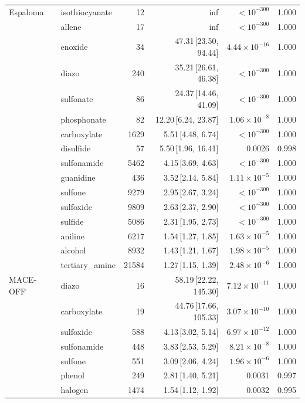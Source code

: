 \begin{table}[t]
\begin{tabular}{llrrrr}
    Espaloma & isothiocyanate & 12 & inf & $< 10^{-300}$ & 1.000 \\
      & allene & 17 & inf & $< 10^{-300}$ & 1.000 \\
      & enoxide & 34 & 47.31\,[23.50, 94.44] & $4.44\times 10^{-16}$ & 1.000 \\
      & diazo & 240 & 35.21\,[26.61, 46.38] & $< 10^{-300}$ & 1.000 \\
      & sulfonate & 86 & 24.37\,[14.46, 41.09] & $< 10^{-300}$ & 1.000 \\
      & phosphonate & 82 & 12.20\,[6.24, 23.87] & $1.06\times 10^{-8}$ & 1.000 \\
      & carboxylate & 1629 & 5.51\,[4.48, 6.74] & $< 10^{-300}$ & 1.000 \\
      & disulfide & 57 & 5.50\,[1.96, 16.41] & 0.0026 & 0.998 \\
      & sulfonamide & 5462 & 4.15\,[3.69, 4.63] & $< 10^{-300}$ & 1.000 \\
      & guanidine & 436 & 3.52\,[2.14, 5.84] & $1.11\times 10^{-5}$ & 1.000 \\
      & sulfone & 9279 & 2.95\,[2.67, 3.24] & $< 10^{-300}$ & 1.000 \\
      & sulfoxide & 9809 & 2.63\,[2.37, 2.90] & $< 10^{-300}$ & 1.000 \\
      & sulfide & 5086 & 2.31\,[1.95, 2.73] & $< 10^{-300}$ & 1.000 \\
      & aniline & 6217 & 1.54\,[1.27, 1.85] & $1.63\times 10^{-5}$ & 1.000 \\
      & alcohol & 8932 & 1.43\,[1.21, 1.67] & $1.98\times 10^{-5}$ & 1.000 \\
      & tertiary\_amine & 21584 & 1.27\,[1.15, 1.39] & $2.48\times 10^{-6}$ & 1.000 \\
    \hline
    MACE-OFF & diazo & 16 & 58.19\,[22.22, 145.30] & $7.12\times 10^{-11}$ & 1.000 \\
      & carboxylate & 19 & 44.76\,[17.66, 105.33] & $3.07\times 10^{-10}$ & 1.000 \\
      & sulfoxide & 588 & 4.13\,[3.02, 5.14] & $6.97\times 10^{-12}$ & 1.000 \\
      & sulfonamide & 448 & 3.83\,[2.53, 5.29] & $8.21\times 10^{-8}$ & 1.000 \\
      & sulfone & 551 & 3.09\,[2.06, 4.24] & $1.96\times 10^{-6}$ & 1.000 \\
      & phenol & 249 & 2.81\,[1.40, 5.21] & 0.0031 & 0.997 \\
      & halogen & 1474 & 1.54\,[1.12, 1.92] & 0.0032 & 0.995 \\

\end{tabular}
\end{table}
